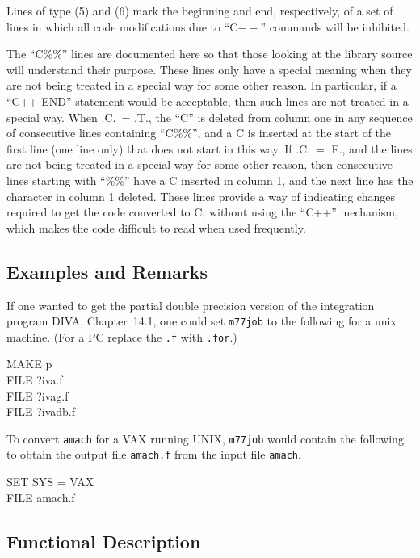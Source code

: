 \documentclass[twoside]{MATH77}
\begin{document}
Lines of type (5) and (6) mark the beginning and end, respectively,
of a set of lines in which all code modifications due to ``C$--$''
commands will be inhibited.

The ``C\%\%'' lines are documented here so that those looking at the
library source will understand their purpose.  These lines only have a
special meaning when they are not being treated in a special way for some
other reason.  In particular, if a ``C++ END'' statement would be
acceptable, then such lines are not treated in a special way.  When .C.\ =
.T., the ``C'' is deleted from column one in any sequence of consecutive
lines containing ``C\%\%'', and a C is inserted at the start of the
first line (one line only) that does not start in this way.  If .C.\ =
.F., and the lines are not being treated in a special way for some other
reason, then consecutive lines starting with ``\%\%'' have a C inserted
in column 1, and the next line has the character in column 1 deleted.
These lines provide a way of indicating changes required to get the code
converted to C, without using the ``C++'' mechanism, which makes the code
difficult to read when used frequently.

\subsection{Examples and Remarks}

If one wanted to get the partial double precision version of the
integration program DIVA, Chapter~14.1, one could set {\tt m77job} to
the following for a unix machine.  (For a PC replace the {\tt .f}
with {\tt.for}.)

{\tt \begin{tabbing}
  MAKE p\\
  FILE ?iva.f\\
  FILE ?ivag.f \\
  FILE ?ivadb.f
\end{tabbing}}

To convert {\tt amach} for a VAX running UNIX, {\tt m77job} would
contain the following to obtain the output file {\tt amach.f} from
the input file {\tt amach}.

{\tt \begin{tabbing}
  SET SYS = VAX\\
  FILE amach.f
\end{tabbing}}

\subsection{Functional Description}
\end{document}
